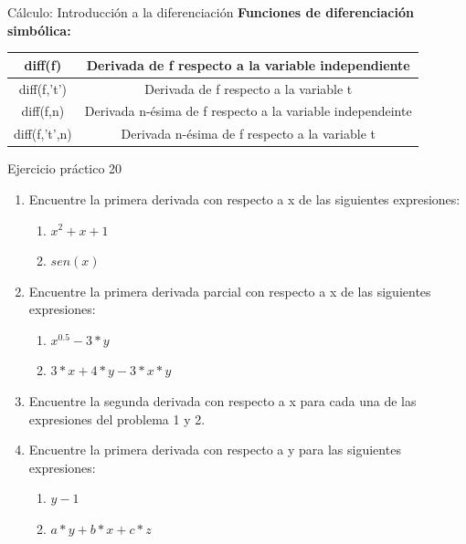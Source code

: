 \documentclass{bredelebeamer}
\begin{document}
\begin{frame}{Cálculo: Introducción a la diferenciación}
\textbf{Funciones de diferenciación simbólica:}
\begin{table}[]
\centering
\begin{tabular}{|c|c|}
\hline
diff(f)       & Derivada de f respecto a la variable independiente     \\ \hline
diff(f,'t')   & Derivada de f respecto a la variable t                 \\ \hline
diff(f,n)     & Derivada n-ésima de f respecto a la variable independeinte \\ \hline
diff(f,'t',n) & Derivada n-ésima de f respecto a la variable t             \\ \hline
\end{tabular}
\end{table}
\end{frame}

\begin{frame}{Ejercicio práctico 20}
\begin{enumerate}
\item Encuentre la primera derivada con respecto a x de las siguientes expresiones:
\begin{enumerate}
\item $x^2+x+1$
\item $sen(x)$
\end{enumerate}
\item Encuentre la primera derivada parcial con respecto a x de las siguientes expresiones:
\begin{enumerate}
\item $x^{0.5 }-3*y$
\item $3*x+4*y-3*x*y$
\end{enumerate}
\item Encuentre la segunda derivada con respecto a x para cada una de las expresiones del problema 1 y 2.
\item Encuentre la primera derivada con respecto a y para las siguientes expresiones:
\begin{enumerate}
\item $y-1$
\item $a*y+b*x+c*z$
\end{enumerate}
\end{enumerate}
\end{frame}
\end{document}
